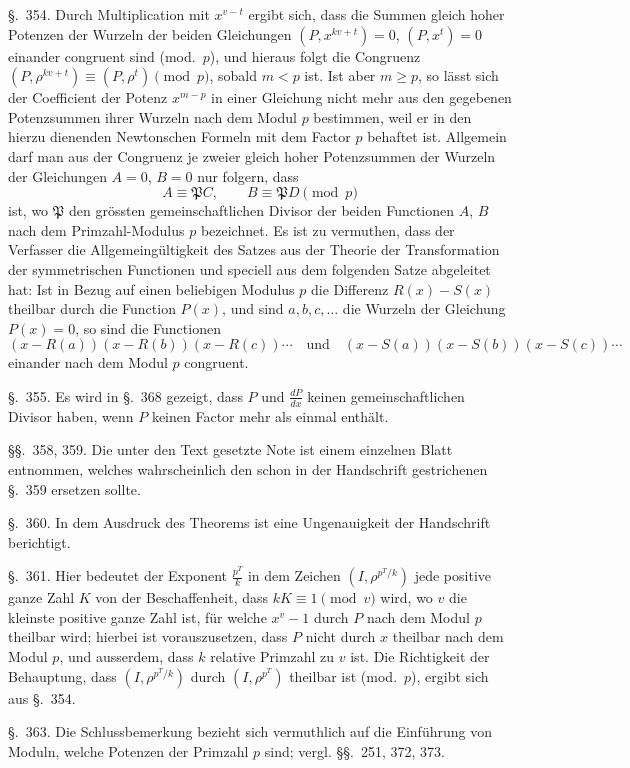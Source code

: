 \documentclass[12pt]{article}
\begin{document}
\S.~354. Durch Multiplication mit $x^{v-t}$ ergibt sich, dass die Summen gleich hoher Potenzen der Wurzeln der beiden Gleichungen $(P,x^{kv+t})=0$, $(P,x^t)=0$ einander congruent sind (mod.~$p$), und hieraus folgt die Congruenz $(P,\rho^{kv+t})\equiv(P,\rho^t)\pmod p$, sobald $m<p$ ist. Ist aber $m\geq p$, so lässt sich der Coefficient der Potenz $x^{m-p}$ in einer Gleichung nicht mehr aus den gegebenen Potenzsummen ihrer Wurzeln nach dem Modul $p$ bestimmen, weil er in den hierzu dienenden Newtonschen Formeln mit dem Factor $p$ behaftet ist. Allgemein darf man aus der Congruenz je zweier gleich hoher Potenzsummen der Wurzeln der Gleichungen $A=0$, $B=0$ nur folgern, dass
\[
A\equiv \mathfrak{P}C,\qquad B\equiv \mathfrak{P}D \pmod p
\]
ist, wo $\mathfrak{P}$ den grössten gemeinschaftlichen Divisor der beiden Functionen $A$, $B$ nach dem Primzahl-Modulus $p$ bezeichnet. Es ist zu vermuthen, dass der Verfasser die Allgemeingültigkeit des Satzes aus der Theorie der Transformation der symmetrischen Functionen und speciell aus dem folgenden Satze abgeleitet hat: Ist in Bezug auf einen beliebigen Modulus $p$ die Differenz $R(x)-S(x)$ theilbar durch die Function $P(x)$, und sind $a,b,c,\ldots$ die Wurzeln der Gleichung $P(x)=0$, so sind die Functionen
\[
(x-R(a))(x-R(b))(x-R(c))\cdots
\quad\text{und}\quad
(x-S(a))(x-S(b))(x-S(c))\cdots
\]
einander nach dem Modul $p$ congruent.

\S.~355. Es wird in \S.~368 gezeigt, dass $P$ und $\frac{dP}{dx}$ keinen gemeinschaftlichen Divisor haben, wenn $P$ keinen Factor mehr als einmal enthält.

\S\S.~358, 359. Die unter den Text gesetzte Note ist einem einzelnen Blatt entnommen, welches wahrscheinlich den schon in der Handschrift gestrichenen \S.~359 ersetzen sollte.

\S.~360. In dem Ausdruck des Theorems ist eine Ungenauigkeit der Handschrift berichtigt.

\S.~361. Hier bedeutet der Exponent $\frac{p^T}{k}$ in dem Zeichen $(I,\rho^{p^T/k})$ jede positive ganze Zahl $K$ von der Beschaffenheit, dass $kK\equiv1\pmod v$ wird, wo $v$ die kleinste positive ganze Zahl ist, für welche $x^v-1$ durch $P$ nach dem Modul $p$ theilbar wird; hierbei ist vorauszusetzen, dass $P$ nicht durch $x$ theilbar nach dem Modul $p$, und ausserdem, dass $k$ relative Primzahl zu $v$ ist. Die Richtigkeit der Behauptung, dass $(I,\rho^{p^T/k})$ durch $(I,\rho^{p^T})$ theilbar ist (mod.~$p$), ergibt sich aus \S.~354.

\S.~363. Die Schlussbemerkung bezieht sich vermuthlich auf die Einführung von Moduln, welche Potenzen der Primzahl $p$ sind; vergl. \S\S.~251, 372, 373.
\end{document}

